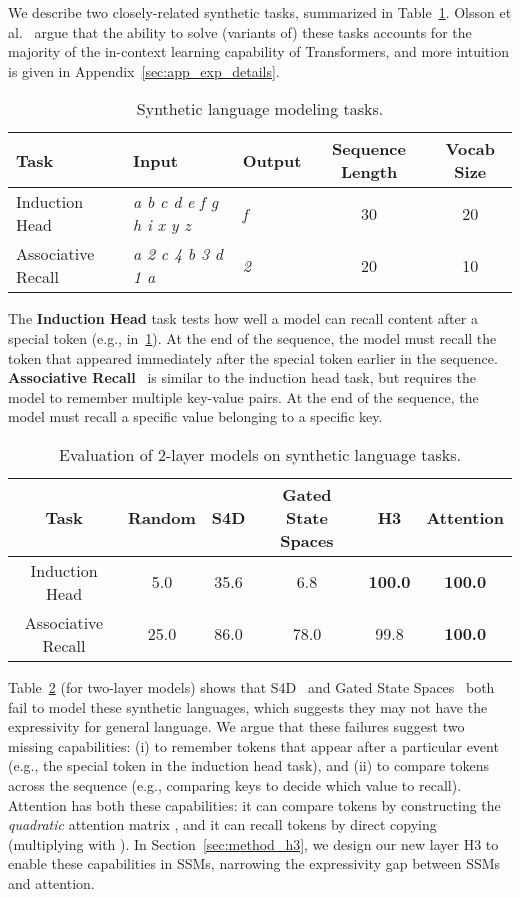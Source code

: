 \documentclass{article}
\newcommand{\hthree}{\textsc{H3}\xspace}
\begin{document}
We describe two closely-related synthetic tasks, summarized in Table~\ref{table:synthetic_tasks}. 
Olsson et al.~\citep{olsson2022context} argue that the ability to solve (variants of) these tasks accounts for the majority of the in-context learning capability of Transformers, and more intuition is given in Appendix~\ref{sec:app_exp_details}. 
\begin{table}[h]
\small
    \centering
    \caption{\label{table:synthetic_tasks} Synthetic language modeling tasks.}
{
        \begin{tabular}{@{}|l|l|l|c|c|@{}}
\hline
        Task & Input & Output & Sequence Length & Vocab Size  \\ \hline
        Induction Head & \textit{a b c d e  f g h i  x y z } & \textit{f} & 30 & 20 \\
        Associative Recall & \textit{a 2 c 4 b 3 d 1 a} & \textit{2} & 20 & 10 \\ \hline
\end{tabular}
    }
\end{table} 
The \textbf{Induction Head} task tests how well a model can recall content after a special token (e.g.,  in~\cref{table:synthetic_tasks}).
At the end of the sequence, the model must recall the token that appeared immediately after the special token earlier in the sequence. \textbf{Associative Recall}~\citep{ba2016using} is similar to the induction head task, but requires the model to remember multiple key-value pairs.
At the end of the sequence, the model must recall a specific value belonging to a specific key.
\begin{table}[h]
\small
    \centering
\caption{\label{table:synthetics} Evaluation of 2-layer models on synthetic language tasks.}
{
        \begin{tabular}{@{}|c|c|ccc|c|@{}}
\hline
        Task & Random & S4D & Gated State Spaces & H3 & Attention  \\ \hline
        Induction Head & 5.0 & 35.6 & 6.8 & \textbf{100.0} & \textbf{100.0} \\
        Associative Recall & 25.0 & 86.0 & 78.0 & 99.8 & \textbf{100.0}  \\ \hline
\end{tabular}
    }
\end{table}

%
 Table~\ref{table:synthetics} (for two-layer models) shows that S4D~\citep{gu2022parameterization} and Gated State Spaces~\citep{mehta2022long} both fail to model these synthetic languages, which suggests they may not have the expressivity for general language.
We argue that these failures suggest two missing capabilities: (i) to remember tokens that appear after a particular event (e.g., the special token in the induction head task), and (ii) to compare tokens across the sequence (e.g., comparing keys to decide which value to recall).
Attention has both these capabilities: it can compare tokens by constructing the \textit{quadratic} attention matrix , and it can recall tokens by direct copying (multiplying  with ).
In Section~\ref{sec:method_h3}, we design our new layer \hthree to enable these capabilities in SSMs, narrowing the expressivity gap between SSMs and attention.
\end{document}

